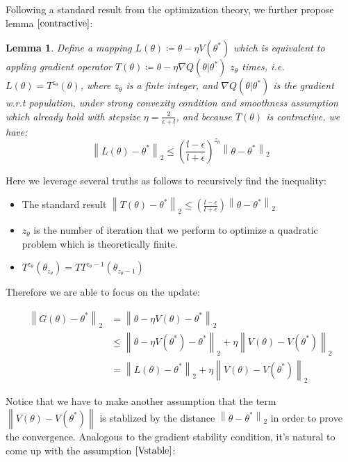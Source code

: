 \documentclass{article}
\newtheorem{lemma}{Lemma}
\begin{document}
Following a standard result from the optimization theory, we further propose lemma $\ref{contractive}$:
\begin{lemma}
  Define a mapping $L(\theta) \coloneqq \theta - \eta V(\theta^*) $ which is equivalent to appling gradient operator $T(\theta)\coloneqq \theta - \eta \nabla Q(\theta|\theta^*)$ $z_{\theta}$ times, i.e. $L(\theta) = T^{z_{\theta}}(\theta)$, where $z_{\theta}$ is a finte integer, and $\nabla Q(\theta|\theta^*)$  is the gradient w.r.t population, under strong
  convexity condition and smoothness assumption which already hold with stepsize $\eta = \frac{2}{\epsilon+l}$, and because $T(\theta)$ is contractive, we have:
  \begin{equation}
    \left\lVert L(\theta) - \theta^* \right\lVert_2 \leq (\frac{l - \epsilon}{l+ \epsilon})^{z_{\theta}}\left\lVert \theta - \theta^* \right\lVert_2
  \label{contraction}
  \end{equation} 
  \label{contractive}
\end{lemma}
Here we leverage several truths as follows to recursively find the inequality:
\begin{itemize}
  \item The standard result $ \left\lVert T(\theta) - \theta^* \right\lVert_2 \leq (\frac{l - \epsilon}{l+ \epsilon})\left\lVert \theta - \theta^* \right\lVert_2  $ 
  \item $z_{\theta}$ is the number of iteration that we perform to optimize a quadratic problem which is theoretically finite.
  \item $ T^{z_{\theta}}(\theta_{z_{\theta}}) = T T^{z_{\theta}-1}(\theta_{z_{\theta}-1})$
\end{itemize}

Therefore we are able to focus on the update:

\begin{equation}
  \begin{aligned}
    \left\lVert G(\theta) - \theta^* \right\lVert_2 & = \left\lVert \theta - \eta V(\theta)- \theta^* \right\lVert_2 \nonumber \\
    & \leq \left\lVert \theta - \eta V(\theta^*)- \theta^* \right\lVert_2 + \eta \left\lVert  V(\theta)-V(\theta^*) \right\lVert_2 \\
    & = \left\lVert L(\theta)- \theta^* \right\lVert_2 + \eta \left\lVert  V(\theta)-V(\theta^*) \right\lVert_2 
  \end{aligned}
 \end{equation}

Notice that we have to make another assumption that the term $\left\lVert  V(\theta)-V(\theta^*) \right\lVert$ is stablized by 
the distance $\left\lVert \theta - \theta^* \right\lVert_2$ in order to prove the convergence. Analogous to the gradient stability
condition, it's natural to come up with the assumption $\ref{Vstable}$:
\end{document}
